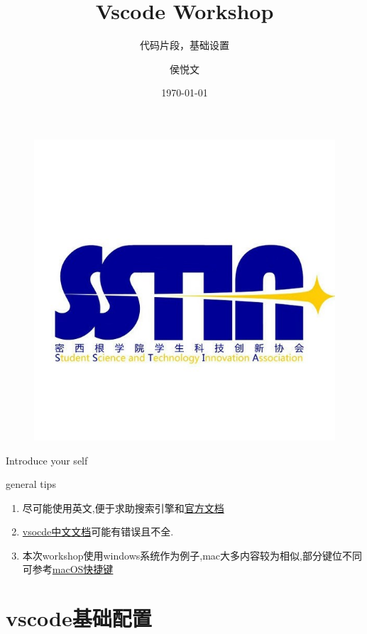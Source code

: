 \documentclass{beamer}
\author{侯悦文}
\title{Vscode Workshop}
\subtitle{代码片段，基础设置}
\institute [SSTIA] {SSTIA}
\date{\today}
\begin{document}
\begin{frame}
    \titlepage
    \begin{figure}[htpb]
        \begin{center}
            \includegraphics[width=0.3\linewidth]{pic/logo.jpg}
        \end{center}
    \end{figure}
    \begin{note}
        {Introduce your self}
    \end{note}

\end{frame}

\begin{frame}
    \tableofcontents[sectionstyle=show,subsectionstyle=show/shaded/hide,subsubsectionstyle=show/shaded/hide]
\end{frame}

\begin{frame}{general tips}
    \begin{enumerate}
        \item 尽可能使用英文,便于求助搜索引擎和\href{https://code.visualstudio.com/docs\#vscode}{官方文档}
        \item \href{https://jeasonstudio.gitbooks.io/vscode-cn-doc/content/}{vsocde中文文档}可能有错误且不全.
        \item 本次workshop使用windows系统作为例子,mac大多内容较为相似,部分键位不同可参考\href{https://code.visualstudio.com/shortcuts/keyboard-shortcuts-macos.pdf}{macOS快捷键}
    \end{enumerate}
\end{frame}

\section{vscode基础配置}
\end{document}
